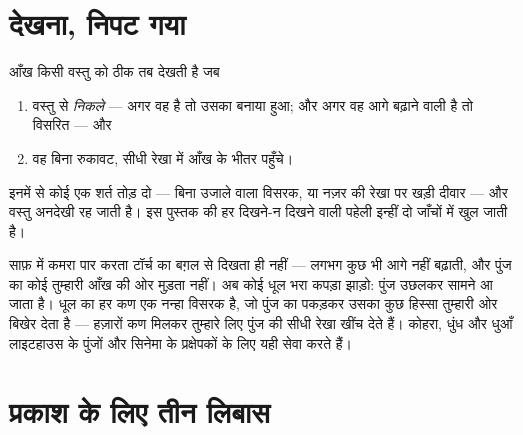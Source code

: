 \section{देखना, निपट गया}

\begin{proposition}[दृष्टि की दो शर्तें]\label{prop:g7:light-sources-propagation:vision}
आँख किसी वस्तु को ठीक तब देखती है जब
\begin{enumerate}
  \item वस्तु से  \emph{निकले} --- अगर वह  है तो
        उसका बनाया हुआ; और अगर वह आगे बढ़ाने वाली है तो विसरित ---
        और
  \item वह  बिना रुकावट, सीधी रेखा में आँख के भीतर पहुँचे।
\end{enumerate}
इनमें से कोई एक शर्त तोड़ दो --- बिना उजाले वाला विसरक, या नज़र की रेखा
पर खड़ी दीवार --- और वस्तु अनदेखी रह जाती है। इस पुस्तक की हर दिखने-न
दिखने वाली पहेली इन्हीं दो जाँचों में खुल जाती है।
\end{proposition}

\begin{example}[दिखने लगा किरणपुंज]\label{ex:g7:light-sources-propagation:beam}
साफ़  में कमरा पार करता टॉर्च का  बग़ल से दिखता ही नहीं ---
 लगभग कुछ भी आगे नहीं बढ़ाती, और पुंज का कोई  तुम्हारी आँख की
ओर मुड़ता नहीं। अब कोई धूल भरा कपड़ा झाड़ो: पुंज उछलकर सामने आ जाता
है। धूल का हर कण एक नन्हा विसरक है, जो पुंज का  पकड़कर उसका कुछ
हिस्सा तुम्हारी ओर बिखेर देता है --- हज़ारों कण मिलकर तुम्हारे लिए पुंज
की सीधी रेखा खींच देते हैं। कोहरा, धुंध और धुआँ लाइटहाउस के पुंजों और
सिनेमा के प्रक्षेपकों के लिए यही सेवा करते हैं।
\end{example}

\section{प्रकाश के लिए तीन लिबास}

